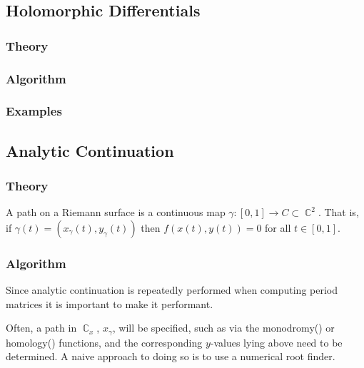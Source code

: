 \documentclass[10pt,twoside]{article}
\numberwithin{equation}{section}
\DeclareMathOperator{\CC}{\mathbb{C}}
\begin{document}
\subsection{Holomorphic Differentials}

%
\subsubsection*{Theory}
%



%
\subsubsection*{Algorithm}
%
%
\subsubsection*{Examples}
%

\subsection{Analytic Continuation}

%
\subsubsection*{Theory}
%

A path on a Riemann surface is a continuous map $\gamma : [0,1] \to C
\subset \CC^2$. That is, if $\gamma(t) = (x_\gamma(t), y_\gamma(t))$
then $f(x(t),y(t)) = 0$ for all $t \in [0,1]$.


%
\subsubsection*{Algorithm}
%

Since analytic continuation is repeatedly performed when computing
period matrices it is important to make it performant.

Often, a path in $\CC_x$, $x_\gamma$, will be specified, such as via the
{\sc monodromy() or homology()} functions, and the corresponding
$y$-values lying above need to be determined. A naive approach to doing
so is to use a numerical root finder.
\end{document}
